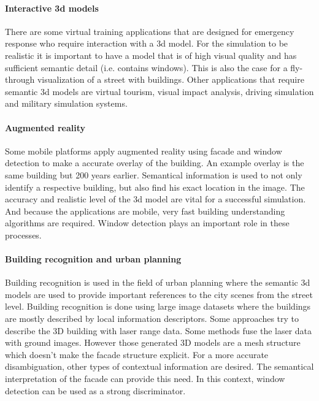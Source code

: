 \paragraph{Interactive 3d models}
	There are some virtual training applications that are designed for
	emergency response who require interaction with a 3d model.  
	For the simulation to be realistic it is important to have a model that is
	of high visual quality and has sufficient semantic detail (i.e. contains
	windows).  This is also the case for a fly-through visualization of a street with
	buildings.
	Other applications that require semantic 3d models are virtual tourism,
	visual impact analysis, driving simulation and military simulation systems.

\paragraph{Augmented reality}
	Some mobile platforms apply augmented reality using facade and window
	detection to make a accurate overlay of the building. An example overlay is the
	same building but 200 years earlier.  Semantical information is used to not
	only identify a respective building, but also find his exact location in the
	image.  The accuracy and realistic level of the 3d model are vital for a
	successful simulation.  And because the applications are mobile, very fast
	building understanding algorithms are required.  Window
	detection plays an important role in these processes.

\paragraph{Building recognition and urban planning}
	Building recognition is used in the field of urban planning where the semantic 3d
	models are used to provide important references to the city scenes from the
	street level.
	Building recognition is done using large image datasets where the
	buildings are mostly described by local information descriptors.  
	Some approaches try to describe the 3D building with laser range data. Some methods fuse the laser data with
	ground images. However those generated 3D models are a mesh structure which doesn't make the facade structure explicit.
	For a more accurate disambiguation, other types of contextual information are
	desired.  The semantical interpretation of the facade can provide this need.
	In this context, window detection can be used as a strong discriminator.\\

